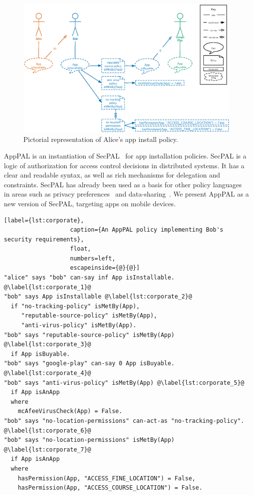 \documentclass[a4paper]{scrartcl}
\begin{document}
\begin{figure}
  \includegraphics{figures/bob-policy.eps}
  \caption{Pictorial representation of Alice's app install policy.}
\label{fig:bobs_policy}
\end{figure}

AppPAL is an instantiation of SecPAL~\citep{Becker:2006vh} for app installation policies. 
SecPAL is a logic of authorization for access control decisions in distributed systems.
It has a clear and readable syntax, as well as rich mechanisms for delegation and constraints.
SecPAL has already been used as a basis for other policy languages in areas such as privacy preferences~\citep{Becker:2009ula} and data-sharing~\citep{Aziz:2011vt}.
We present AppPAL as a new version of SecPAL, targeting apps on mobile devices.

\begin{lstlisting}[label={lst:corporate}, 
                   caption={An AppPAL policy implementing Bob's security requirements},
                   float,
                   numbers=left,
                   escapeinside={@}{@}]
"alice" says "bob" can-say inf App isInstallable. @\label{lst:corporate_1}@
"bob" says App isInstallable @\label{lst:corporate_2}@
  if "no-tracking-policy" isMetBy(App),
     "reputable-source-policy" isMetBy(App),
     "anti-virus-policy" isMetBy(App).
"bob" says "reputable-source-policy" isMetBy(App) @\label{lst:corporate_3}@
  if App isBuyable.
"bob" says "google-play" can-say 0 App isBuyable. @\label{lst:corporate_4}@
"bob" says "anti-virus-policy" isMetBy(App) @\label{lst:corporate_5}@
  if App isAnApp
  where
    mcAfeeVirusCheck(App) = False.
"bob" says "no-location-permissions" can-act-as "no-tracking-policy". @\label{lst:corporate_6}@
"bob" says "no-location-permissions" isMetBy(App) @\label{lst:corporate_7}@
  if App isAnApp
  where
    hasPermission(App, "ACCESS_FINE_LOCATION") = False,
    hasPermission(App, "ACCESS_COURSE_LOCATION") = False.
\end{lstlisting}
\end{document}
